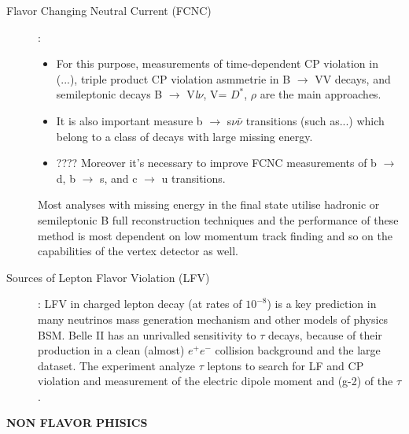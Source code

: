 \begin{description}
\item[Flavor Changing Neutral Current (FCNC)]: 
	\begin{itemize}
	\item For this purpose, measurements of time-dependent CP violation in (...), triple product CP violation asmmetrie in B $\rightarrow$ VV decays, and semileptonic decays B $\rightarrow$ V\textit{l}$\nu$, V= $D^{*}$, $\rho$ are the main approaches. 
	\item It is also important measure b $\rightarrow$ s$\nu\bar{\nu}$ transitions (such as...) which belong to a class of decays with large missing energy. 
	\item???? Moreover it's necessary to improve FCNC measurements of b $\rightarrow$ d, b $\rightarrow$ s, and c $\rightarrow$ u transitions. 
	\end{itemize}
	
Most analyses with missing energy in the final state utilise hadronic or semileptonic B full reconstruction techniques and the performance of these method is most dependent on low momentum track finding and so on the capabilities of the vertex detector as well.

\item [Sources of Lepton Flavor Violation (LFV)]: LFV in charged lepton decay (at rates of $10^{-8}$) is a key prediction in many neutrinos mass generation mechanism and other models of physics BSM. Belle II has an unrivalled sensitivity to $\tau$ decays, because of their production in a clean (almost) $e^{+}e^{-}$ collision background and the large dataset. The experiment analyze $\tau$ leptons to search for LF and CP violation and measurement of the electric dipole moment and (g-2) of the $\tau$.

\end{description}

\textbf{NON FLAVOR PHISICS}

